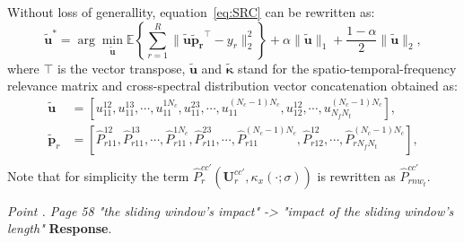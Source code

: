 \documentclass[runningheads]{llncs}
\providecommand{\promed}[1]{{\mathbb{E}}\left\lbrace #1\right\rbrace}%
\newcommand{\ve}[1]{\bm {#1}}
\newcommand{\mat}[1]{\bm {#1}}
\newenvironment{reviewer}{\setcounter{pointcounter}{1}}{}
\newcommand{\changes}[1]{\textcolor[rgb]{1.00,0.00,0.00}{#1}}
\newcommand{\point}[1]{\medskip \noindent
 \textsl{{\fontseries{b}\selectfont Point \thepointcounter}.
 \stepcounter{pointcounter} #1}}
\newcommand{\reply}{\medskip \noindent \textbf{Response}.\ }
\begin{document}
\begin{reviewer}
{\changes{Without loss of generallity, equation~\eqref{eq:SRC} can be rewritten as:
\begin{equation}
	\ve{\tilde{u}}^* = \arg \min_{\ve{\tilde{u}}} \promed{\sum_{r=1}^{R} \|\ve{\tilde{u}}\ve{\tilde{p}_{r}}^{\top}-y_r\|^2_2} + \alpha \|\ve{\tilde{u}}\|_1 + \frac{1-\alpha}{2} \|\ve{\tilde{u}}\|_2, \label{eq:SRC_vec}
\end{equation}
where $\top$ is the vector transpose, $\ve{\tilde{u}}$ and $\ve{\tilde{\kappa}}$ stand for the spatio-temporal-frequency relevance matrix and cross-spectral distribution vector concatenation obtained as:
\begin{equation}
	\begin{aligned}
		\ve{\tilde{u}} &= \left[u_{11}^{12},u_{11}^{13},\cdots,u_{11}^{1N_c},u_{11}^{23},\cdots,u_{11}^{(N_c-1)N_c},u_{12}^{12},\cdots, u_{N_fN_t}^{(N_c-1)N_c} \right], \\
		\ve{\tilde{p}}_{r} &= \left[ \hat{P}_{r11}^{12},\hat{P}_{r11}^{13},\cdots,\hat{P}_{r11}^{1N_c},\hat{P}_{r11}^{23},\cdots,\hat{P}_{r11}^{(N_c-1)N_c},\hat{P}_{r12}^{12},\cdots, \hat{P}_{rN_fN_t}^{(N_c-1)N_c} \right] ,\\
	\end{aligned}
\end{equation}
Note that for simplicity the term $\hat{P}^{cc'}_{r}(\mat{U}^{cc'}_{r},\kappa_x\left(\cdot;\sigma\right))$ is rewritten as $\hat{P}^{cc'}_{rnw_t}$.
}
}

\point{Page 58 "the sliding window's impact" -> "impact of the sliding window's length"}
\reply{
    
}








\end{reviewer}
\end{document}
